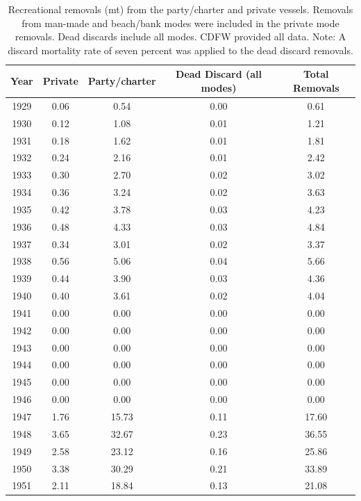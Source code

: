 \documentclass[12pt,]{article}
\begin{document}
\begin{longtable}{ccccc}
\caption{Recreational removals (mt) from the party/charter 
                                        and private vessels. Removals from man-made and 
                                        beach/bank modes were included in the private mode
                                        removals. Dead discards include all modes. CDFW provided 
                                        all data. Note: A discard mortality rate of seven percent 
                                        was applied 
                                        to the dead discard removals.} \\ 
  \hline
Year & Private & Party/charter & Dead Discard (all modes) & Total Removals \\ 
  \hline \endhead  \hline
1929 & 0.06 & 0.54 & 0.00 & 0.61 \\ 
  1930 & 0.12 & 1.08 & 0.01 & 1.21 \\ 
  1931 & 0.18 & 1.62 & 0.01 & 1.81 \\ 
  1932 & 0.24 & 2.16 & 0.01 & 2.42 \\ 
  1933 & 0.30 & 2.70 & 0.02 & 3.02 \\ 
  1934 & 0.36 & 3.24 & 0.02 & 3.63 \\ 
  1935 & 0.42 & 3.78 & 0.03 & 4.23 \\ 
  1936 & 0.48 & 4.33 & 0.03 & 4.84 \\ 
  1937 & 0.34 & 3.01 & 0.02 & 3.37 \\ 
  1938 & 0.56 & 5.06 & 0.04 & 5.66 \\ 
  1939 & 0.44 & 3.90 & 0.03 & 4.36 \\ 
  1940 & 0.40 & 3.61 & 0.02 & 4.04 \\ 
  1941 & 0.00 & 0.00 & 0.00 & 0.00 \\ 
  1942 & 0.00 & 0.00 & 0.00 & 0.00 \\ 
  1943 & 0.00 & 0.00 & 0.00 & 0.00 \\ 
  1944 & 0.00 & 0.00 & 0.00 & 0.00 \\ 
  1945 & 0.00 & 0.00 & 0.00 & 0.00 \\ 
  1946 & 0.00 & 0.00 & 0.00 & 0.00 \\ 
  1947 & 1.76 & 15.73 & 0.11 & 17.60 \\ 
  1948 & 3.65 & 32.67 & 0.23 & 36.55 \\ 
  1949 & 2.58 & 23.12 & 0.16 & 25.86 \\ 
  1950 & 3.38 & 30.29 & 0.21 & 33.89 \\ 
  1951 & 2.11 & 18.84 & 0.13 & 21.08 \\ 

\end{longtable}
\end{document}
